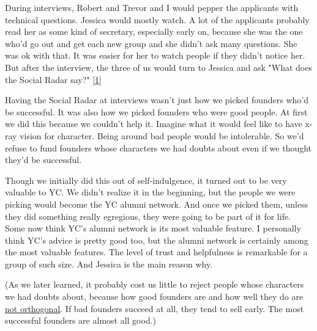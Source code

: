 During interviews, Robert and Trevor and
                  I would pepper the applicants with technical questions.
                  Jessica would mostly watch. A lot of the applicants probably
                  read her as some kind of secretary, especially early on,
                  because she was the one who'd go out and get each new group
                  and she didn't ask many questions. She was ok with that. It
                  was easier for her to watch people if they didn't notice her.
                  But after the interview, the three of us would turn to Jessica
                  and ask "What does the Social Radar say?"
                  [\href{\#f1n}{1}]

Having the Social Radar at interviews wasn't just
                  how we picked founders who'd be successful. It was also how we
                  picked founders who were good people. At first we did this
                  because we couldn't help it. Imagine what it would feel like
                  to have x-ray vision for character. Being around bad people
                  would be intolerable. So we'd refuse to fund founders whose
                  characters we had doubts about even if we thought they'd be
                  successful.

Though we initially did this out of
                  self-indulgence, it turned out to be very valuable to YC. We
                  didn't realize it in the beginning, but the people we were
                  picking would become the YC alumni network. And once we picked
                  them, unless they did something really egregious, they were
                  going to be part of it for life. Some now think YC's alumni
                  network is its most valuable feature. I personally think YC's
                  advice is pretty good too, but the alumni network is certainly
                  among the most valuable features. The level of trust and
                  helpfulness is remarkable for a group of such size. And
                  Jessica is the main reason why.

(As we later
                  learned, it probably cost us little to reject people whose
                  characters we had doubts about, because how good founders are
                  and how well they do are
                  \href{http://www.paulgraham.com/mean.html}{\underline{not orthogonal}}. If bad founders succeed at all, they tend to sell early.
                  The most successful founders are almost all good.)

